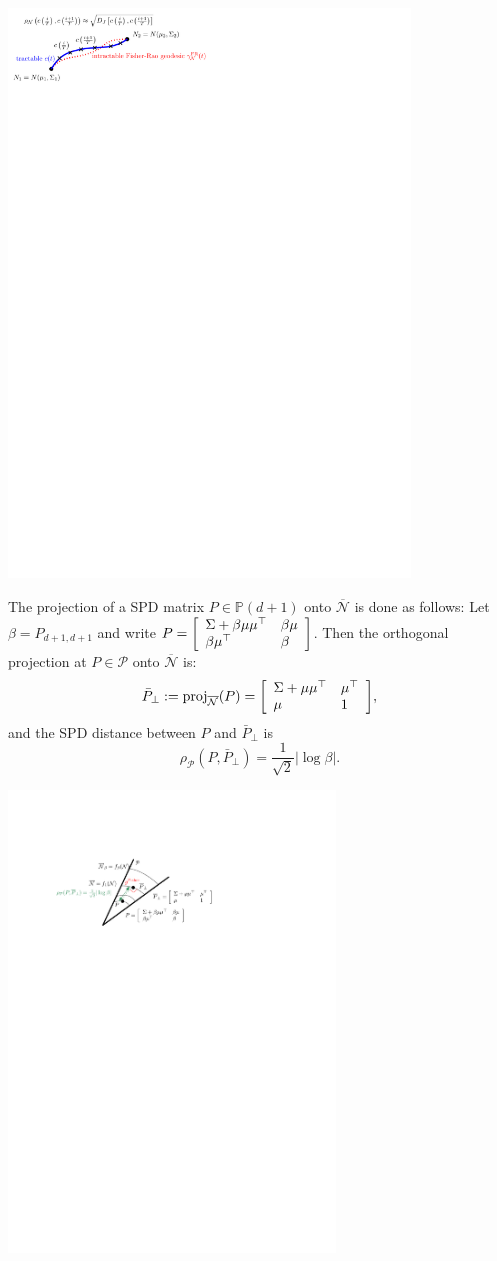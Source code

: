 \documentclass{article}
\def\bbP{\mathbb{P}}
\def\proj{\mathrm{proj}}
\def\barN{{\overline{\mathcal{N}}}}
\def\mattwotwo#1#2#3#4{{\left[\begin{array}{ll}#1 & #2\cr #3 & #4\end{array}\right]}}
\def\calP{\mathcal{P}}
\def\barP{{\bar P}}
\begin{document}
\includegraphics[width=0.8\textwidth]{FigIpe-ApproximationTractableCurve.pdf}

The projection of a SPD matrix $P\in\bbP(d+1)$ onto $\barN$ is done as follows:
Let $\beta=P_{d+1,d+1}$ and write  $P=\mattwotwo{\Sigma+\beta\mu\mu^\top}{\beta\mu}{\beta\mu^\top}{\beta}$.
Then the orthogonal projection at $P\in\calP$ onto $\barN$ is:
$$
\barP_\perp:=\proj_{\barN}(P)=\mattwotwo{\Sigma+\mu\mu^\top}{\mu^\top}{\mu}{1},
$$
and the SPD distance between $P$ and $\barP_\perp$  is
$$
\rho_\calP(P,\barP_\perp)=\frac{1}{\sqrt{2}} |\log\beta|.
$$

\includegraphics[width=0.65\textwidth]{FigIpe-OrthogonalProjectionSPD.pdf}
\end{document}
